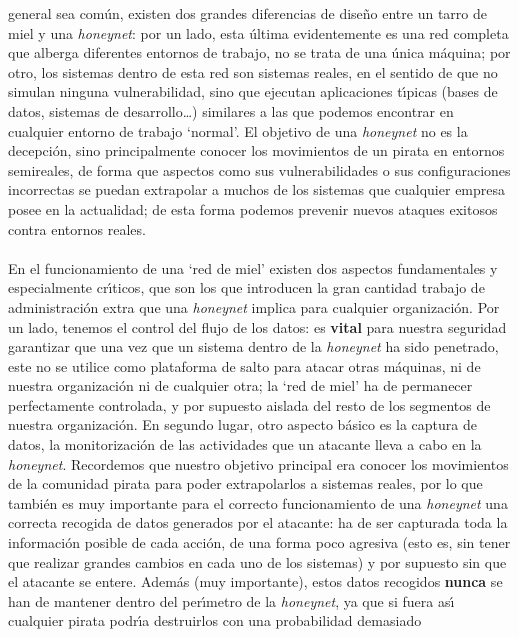 general sea com\'un, existen dos grandes diferencias de dise\~no entre un 
tarro de miel y una {\it honeynet}: por un lado, esta \'ultima evidentemente es
una red completa que alberga diferentes entornos de trabajo, no se trata de una
\'unica m\'aquina; por otro, los sistemas dentro de esta red son sistemas 
reales, en el sentido de que no simulan ninguna vulnerabilidad, sino que 
ejecutan aplicaciones t\'{\i}picas (bases de datos, sistemas de 
desarrollo\ldots) similares a las que podemos encontrar en cualquier entorno de
trabajo `normal'. El objetivo de una {\it honeynet} no es la decepci\'on, sino 
principalmente conocer los movimientos de un pirata en entornos semireales, de 
forma que aspectos como sus vulnerabilidades o sus configuraciones incorrectas 
se puedan extrapolar a muchos de los sistemas que cualquier empresa posee
en la actualidad; de esta forma podemos prevenir nuevos ataques exitosos contra 
entornos reales.\\
\\En el funcionamiento de una `red de miel' existen dos aspectos fundamentales
y especialmente cr\'{\i}ticos, que son los que introducen la gran cantidad 
trabajo de administraci\'on extra que una {\it ho\-ney\-net} implica para 
cualquier organizaci\'on. Por un lado, tenemos el control del flujo de los 
datos: es {\bf vital} para nuestra seguridad garantizar que una vez que un 
sistema dentro 
de la {\it honeynet} ha sido penetrado, este no se utilice como plataforma de
salto para atacar otras m\'aquinas, ni de nuestra organizaci\'on ni de cualquier
otra; la `red de miel' ha de permanecer perfectamente controlada, y por supuesto
aislada del resto de los segmentos de nuestra organizaci\'on. En segundo lugar,
otro aspecto b\'asico es la captura de datos, la monitorizaci\'on de las
actividades que un atacante lleva a cabo en la {\it honeynet}. Recordemos que 
nuestro objetivo principal era conocer los movimientos de la comunidad pirata
para poder extrapolarlos a sistemas reales, por lo que tambi\'en es muy 
importante para el correcto funcionamiento de una {\it honeynet} una correcta
recogida de datos generados por el atacante: ha de ser capturada toda la 
informaci\'on posible de cada acci\'on, de una forma poco agresiva (esto es, 
sin tener que realizar grandes cambios en cada uno de los sistemas) y por
supuesto sin que el atacante se entere. Adem\'as (muy importante), estos datos 
recogidos {\bf nunca} se
han de mantener dentro del per\'{\i}metro de la {\it honeynet}, ya que si fuera
as\'{\i} cualquier pirata podr\'{\i}a destruirlos con una probabilidad demasiado
